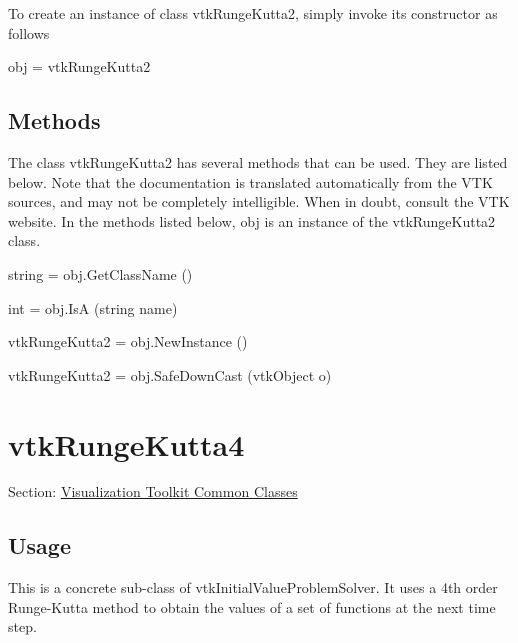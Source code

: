 To create an instance of class vtk\-Runge\-Kutta2, simply invoke its constructor as follows \begin{DoxyVerb}  obj = vtkRungeKutta2
\end{DoxyVerb}
 \hypertarget{vtkwidgets_vtkxyplotwidget_Methods}{}\subsection{Methods}\label{vtkwidgets_vtkxyplotwidget_Methods}
The class vtk\-Runge\-Kutta2 has several methods that can be used. They are listed below. Note that the documentation is translated automatically from the V\-T\-K sources, and may not be completely intelligible. When in doubt, consult the V\-T\-K website. In the methods listed below, {\ttfamily obj} is an instance of the vtk\-Runge\-Kutta2 class. 
\begin{DoxyItemize}
\item {\ttfamily string = obj.\-Get\-Class\-Name ()}  
\item {\ttfamily int = obj.\-Is\-A (string name)}  
\item {\ttfamily vtk\-Runge\-Kutta2 = obj.\-New\-Instance ()}  
\item {\ttfamily vtk\-Runge\-Kutta2 = obj.\-Safe\-Down\-Cast (vtk\-Object o)}  
\end{DoxyItemize}\hypertarget{vtkcommon_vtkrungekutta4}{}\section{vtk\-Runge\-Kutta4}\label{vtkcommon_vtkrungekutta4}
Section\-: \hyperlink{sec_vtkcommon}{Visualization Toolkit Common Classes} \hypertarget{vtkwidgets_vtkxyplotwidget_Usage}{}\subsection{Usage}\label{vtkwidgets_vtkxyplotwidget_Usage}
This is a concrete sub-\/class of vtk\-Initial\-Value\-Problem\-Solver. It uses a 4th order Runge-\/\-Kutta method to obtain the values of a set of functions at the next time step.

